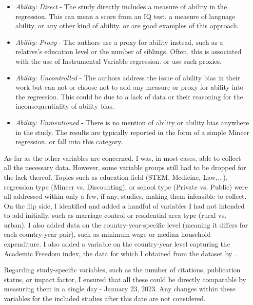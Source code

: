 \begin{itemize}
   \item \textit{Ability: Direct} - The study directly includes a measure of ability in the regression. This can mean a score from an IQ test, a measure of language ability, or any other kind of ability. \cite{grogger1995changes} or \cite{vanpraag2013higher} are good examples of this approach.
   \item \textit{Ability: Proxy} - The authors use a proxy for ability instead, such as a relative's education level or the number of siblings. Often, this is associated with the use of Instrumental Variable regression. \cite{card1995using} or \cite{debrauw2008reconciling} use such proxies.
   \item \textit{Ability: Uncontrolled} - The authors address the issue of ability bias in their work but can not or choose not to add any measure or proxy for ability into the regression. This could be due to a lack of data or their reasoning for the inconsequentiality of ability bias. \citep{angrist1991compulsory, fang2012returns}
   \item \textit{Ability: Unmentioned} - There is no mention of ability or ability bias anywhere in the study. The results are typically reported in the form of a simple Mincer regression. \cite{staiger1997instrumental} or \cite{acemoglu1999} fall into this category.
\end{itemize}


As far as the other variables are concerned, I was, in most cases, able to collect all the necessary data. However, some variable groups still had to be dropped for the lack thereof. Topics such as education field (STEM, Medicine, Law,...), regression type (Mincer vs. Discounting), or school type (Private vs. Public) were all addressed within only a few, if any, studies, making them infeasible to collect. On the flip side, I identified and added a handful of variables I had not intended to add initially, such as marriage control or residential area type (rural vs. urban). I also added data on the country-year-specific level (meaning it differs for each country-year pair), such as minimum wage or median household expenditure. I also added a variable on the country-year level capturing the Academic Freedom index, the data for which I obtained from the dataset by \cite{VDemV13}.

Regarding study-specific variables, such as the number of citations, publication status, or impact factor, I ensured that all these could be directly comparable by measuring them in a single day - January 23, 2023. Any changes within these variables for the included studies after this date are not considered.

